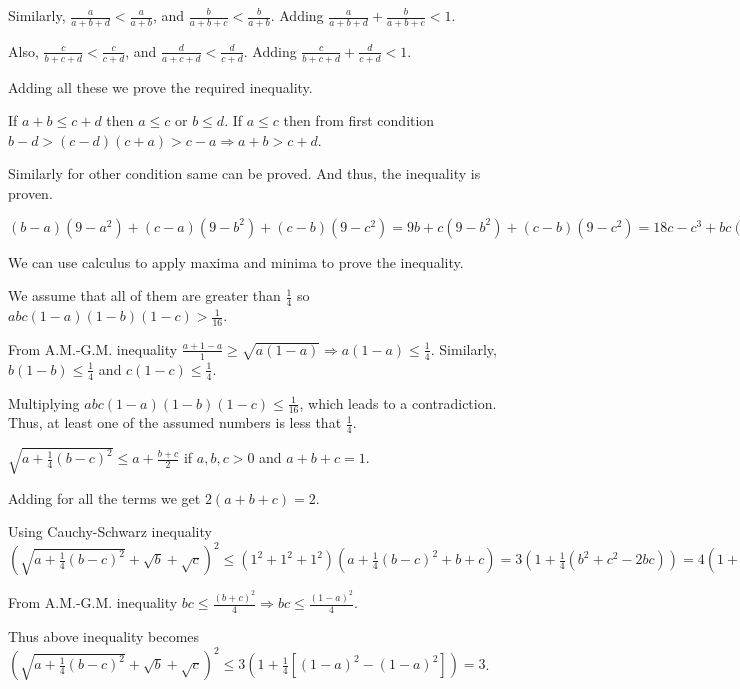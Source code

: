   Similarly, $\frac{a}{a + b + d} < \frac{a}{a + b}$, and $\frac{b}{a + b + c} < \frac{b}{a + b}$. Adding
  $\frac{a}{a + b + d} + \frac{b}{a + b + c} < 1$.

  Also, $\frac{c}{b + c + d} < \frac{c}{c + d}$, and $\frac{d}{a + c + d} < \frac{d}{c + d}$. Adding
  $\frac{c}{b + c + d} + \frac{d}{c + d} < 1$.

  Adding all these we prove the required inequality.
\item If $a + b\leq c + d$ then $a\leq c$ or $b\leq d$. If $a\leq c$ then from first condition $b - d> (c -
  d)(c + a) > c - a \Rightarrow a + b > c + d$.

  Similarly for other condition same can be proved. And thus, the inequality is proven.
\item $(b - a)(9 - a^2) + (c - a)(9 - b^2) + (c - b)(9 - c^2) = 9b + c(9 - b^2) + (c - b)(9 - c^2) = 18c -
  c^3 + bc(c - b)\leq 18 c - c^3 + \frac{1}{4}c^3= 18c - \frac{3}{4}c^2$

  We can use calculus to apply maxima and minima to prove the inequality.
\item We assume that all of them are greater than $\frac{1}{4}$ so $abc(1 - a)(1 - b)(1 - c) >
  \frac{1}{16}$.

  From A.M.-G.M. inequality $\frac{a + 1 - a}{1}\geq \sqrt{a(1 - a)}\Rightarrow a(1 - a)\leq
  \frac{1}{4}$. Similarly, $b(1 - b)\leq \frac{1}{4}$ and $c(1 - c)\leq \frac{1}{4}$.

  Multiplying $abc(1 - a)(1 - b)(1 - c)\leq \frac{1}{16}$, which leads to a contradiction. Thus, at least
  one of the assumed numbers is less that $\frac{1}{4}$.
\item $\sqrt{a + \frac{1}{4}(b - c)^2}\leq a + \frac{b + c}{2}$ if $a, b, c > 0$ and $a + b + c = 1$.

  Adding for all the terms we get $2(a + b + c) = 2$.
\item Using Cauchy-Schwarz inequality $\left(\sqrt{a + \frac{1}{4}(b - c)^2} + \sqrt{b} +
  \sqrt{c}\right)^2\leq (1^2 + 1^2 + 1^2)\left(a + \frac{1}{4}(b - c)^2 + b + c\right) = 3\left(1 +
  \frac{1}{4}(b^2 + c^2 - 2bc)\right) = 4\left(1 + \frac{1}{4}[(1 - a)^2 - 4bc]\right)$

  From A.M.-G.M. inequality $bc\leq \frac{(b + c)^2}{4}\Rightarrow bc\leq \frac{(1 - a)^2}{4}$.

  Thus above inequality becomes $\left(\sqrt{a + \frac{1}{4}(b - c)^2} + \sqrt{b} +
  \sqrt{c}\right)^2\leq 3\left(1 + \frac{1}{4}[(1 - a)^2 - (1 - a)^2]\right) = 3$.

